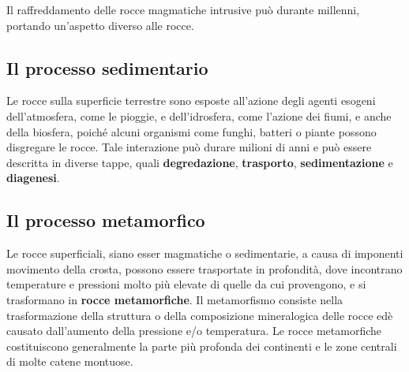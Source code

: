 \documentclass[a4paper]{article}
\begin{document}



Il raffreddamento delle rocce magmatiche intrusive può durante millenni,
portando un'aspetto diverso alle rocce.


\pagebreak

\subsection{Il processo sedimentario}

Le rocce sulla superficie terrestre sono esposte all'azione degli agenti esogeni
dell'atmosfera, come le pioggie, e dell'idrosfera, come l'azione dei fiumi,
e anche della biosfera, poiché alcuni organismi come funghi, batteri o piante possono disgregare le rocce.
Tale interazione può durare milioni di anni e può essere descritta in diverse tappe,
quali \textbf{degredazione}, \textbf{trasporto}, \textbf{sedimentazione} e \textbf{diagenesi}.


\subsection{Il processo metamorfico}

Le rocce superficiali, siano esser magmatiche o sedimentarie, a causa di imponenti
movimento della crosta, possono essere trasportate in profondità, dove incontrano
temperature e pressioni molto più elevate di quelle da cui provengono, e si
trasformano in \textbf{rocce metamorfiche}.
Il metamorfismo consiste nella trasformazione della struttura
o della composizione mineralogica delle rocce edè causato dall'aumento della pressione e/o temperatura.
Le rocce metamorfiche costituiscono generalmente la parte più profonda dei continenti e le zone centrali
di molte catene montuose.
\end{document}
